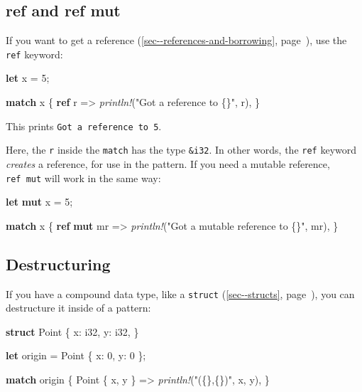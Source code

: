 \documentclass[a4paper,]{book}
\renewcommand*{\hyperref}[2][\ar]{%
  \def\ar{#2}%
  #2 (\autoref{#1}, page~\pageref{#1})}
\newenvironment{Shaded}{\begin{snugshade}}{\end{snugshade}}
\newcommand{\KeywordTok}[1]{\textcolor[rgb]{0.13,0.29,0.53}{\textbf{{#1}}}}
\newcommand{\DataTypeTok}[1]{\textcolor[rgb]{0.13,0.29,0.53}{{#1}}}
\newcommand{\DecValTok}[1]{\textcolor[rgb]{0.00,0.00,0.81}{{#1}}}
\newcommand{\StringTok}[1]{\textcolor[rgb]{0.31,0.60,0.02}{{#1}}}
\newcommand{\PreprocessorTok}[1]{\textcolor[rgb]{0.56,0.35,0.01}{\textit{{#1}}}}
\newcommand{\NormalTok}[1]{{#1}}
\begin{document}
\subsection{ref and ref mut}\label{ref-and-ref-mut}

If you want to get a
\hyperref[sec--references-and-borrowing]{reference}, use the
\texttt{ref} keyword:

\begin{Shaded}
\begin{Highlighting}[]
\KeywordTok{let} \NormalTok{x = }\DecValTok{5}\NormalTok{;}

\KeywordTok{match} \NormalTok{x \{}
    \KeywordTok{ref} \NormalTok{r => }\PreprocessorTok{println!}\NormalTok{(}\StringTok{"Got a reference to \{\}"}\NormalTok{, r),}
\NormalTok{\}}
\end{Highlighting}
\end{Shaded}

This prints \texttt{Got\ a\ reference\ to\ 5}.

Here, the \texttt{r} inside the \texttt{match} has the type
\texttt{\&i32}. In other words, the \texttt{ref} keyword \emph{creates}
a reference, for use in the pattern. If you need a mutable reference,
\texttt{ref\ mut} will work in the same way:

\begin{Shaded}
\begin{Highlighting}[]
\KeywordTok{let} \KeywordTok{mut} \NormalTok{x = }\DecValTok{5}\NormalTok{;}

\KeywordTok{match} \NormalTok{x \{}
    \KeywordTok{ref} \KeywordTok{mut} \NormalTok{mr => }\PreprocessorTok{println!}\NormalTok{(}\StringTok{"Got a mutable reference to \{\}"}\NormalTok{, mr),}
\NormalTok{\}}
\end{Highlighting}
\end{Shaded}

\subsection{Destructuring}\label{destructuring}

If you have a compound data type, like a
\hyperref[sec--structs]{\texttt{struct}}, you can destructure it inside
of a pattern:

\begin{Shaded}
\begin{Highlighting}[]
\KeywordTok{struct} \NormalTok{Point \{}
    \NormalTok{x: }\DataTypeTok{i32}\NormalTok{,}
    \NormalTok{y: }\DataTypeTok{i32}\NormalTok{,}
\NormalTok{\}}

\KeywordTok{let} \NormalTok{origin = Point \{ x: }\DecValTok{0}\NormalTok{, y: }\DecValTok{0} \NormalTok{\};}

\KeywordTok{match} \NormalTok{origin \{}
    \NormalTok{Point \{ x, y \} => }\PreprocessorTok{println!}\NormalTok{(}\StringTok{"(\{\},\{\})"}\NormalTok{, x, y),}
\NormalTok{\}}
\end{Highlighting}
\end{Shaded}
\end{document}

